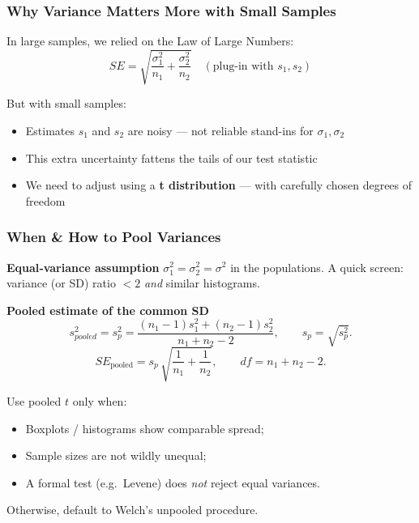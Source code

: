 \documentclass[handout]{beamer}
\begin{document}
\begin{frame}
\frametitle{Why Variance Matters More with Small Samples}

In large samples, we relied on the Law of Large Numbers:\\
\[
SE = \sqrt{\frac{\sigma_1^2}{n_1} + \frac{\sigma_2^2}{n_2}} \quad (\text{plug-in with } s_1, s_2)
\]

\vspace{1em}
\pause

\large
But with small samples:
\begin{itemize}
  \item Estimates \(s_1\) and \(s_2\) are noisy — not reliable stand-ins for \(\sigma_1, \sigma_2\)
  \item This extra uncertainty fattens the tails of our test statistic
  \item We need to adjust using a \textbf{t distribution} — with carefully chosen degrees of freedom
\end{itemize}
\end{frame}


\begin{frame}
\frametitle{When \& How to Pool Variances}

\textbf{Equal‐variance assumption}  
\(\sigma_1^2 = \sigma_2^2 = \sigma^2\) in the populations.  
A quick screen: variance (or SD) ratio $<2$ \textit{and} similar histograms.

\vspace{0.5em}
\textbf{Pooled estimate of the common SD}
\[
s_{pooled}^2 = 
s_p^2
= 
\frac{(n_1-1)s_1^{2} + (n_2-1)s_2^{2}}
     {\,n_1+n_2-2\,},
\qquad
s_p = \sqrt{s_p^2}.
\]
\[
SE_{\text{pooled}}
=
s_p\,
\sqrt{\frac{1}{n_1}+\frac{1}{n_2}},
\qquad
df = n_1+n_2-2.
\]

\begin{block}{Use pooled $t$ only when:}
\begin{itemize}
  \item Boxplots / histograms show comparable spread;\\[-0.4em]
  \item Sample sizes are not wildly unequal;\\[-0.4em]
  \item A formal test (e.g.\ Levene) does \emph{not} reject equal variances.
\end{itemize}
\end{block}

\alert{Otherwise, default to Welch’s unpooled procedure.}
\end{frame}
\end{document}
